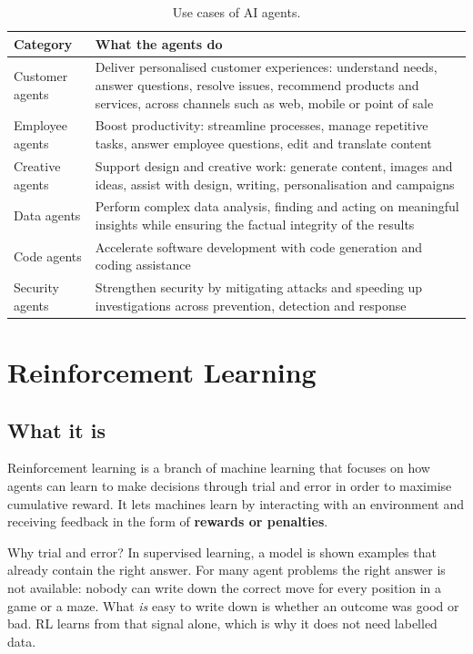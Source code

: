\documentclass[11pt, a4paper]{article}
\begin{document}
\begin{table}[H]
\centering
\small
\caption{Use cases of AI agents.}
\label{tab:usecases}
\begin{tabularx}{\textwidth}{l X}
\toprule
Category & What the agents do \\
\midrule
Customer agents & Deliver personalised customer experiences: understand needs, answer questions, resolve issues, recommend products and services, across channels such as web, mobile or point of sale \\
Employee agents & Boost productivity: streamline processes, manage repetitive tasks, answer employee questions, edit and translate content \\
Creative agents & Support design and creative work: generate content, images and ideas, assist with design, writing, personalisation and campaigns \\
Data agents & Perform complex data analysis, finding and acting on meaningful insights while ensuring the factual integrity of the results \\
Code agents & Accelerate software development with code generation and coding assistance \\
Security agents & Strengthen security by mitigating attacks and speeding up investigations across prevention, detection and response \\
\bottomrule
\end{tabularx}
\end{table}

\section{Reinforcement Learning}
\label{sec:rl}

\subsection{What it is}

Reinforcement learning is a branch of machine learning that focuses on how agents can learn to make decisions through trial and error in order to maximise cumulative reward. It lets machines learn by interacting with an environment and receiving feedback in the form of \textbf{rewards or penalties}.

Why trial and error? In supervised learning, a model is shown examples that already contain the right answer. For many agent problems the right answer is not available: nobody can write down the correct move for every position in a game or a maze. What \emph{is} easy to write down is whether an outcome was good or bad. RL learns from that signal alone, which is why it does not need labelled data.
\end{document}
